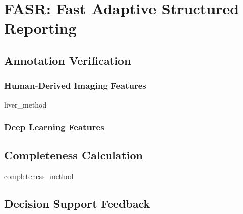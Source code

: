 \chapter{FASR: Fast Adaptive Structured Reporting}


\section{Annotation Verification}
\subsection{Human-Derived Imaging Features}
{liver_method}
\subsection{Deep Learning Features}

\section{Completeness Calculation}
{completeness_method}

\section{Decision Support Feedback}

